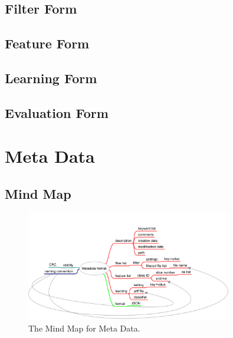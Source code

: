 \documentclass[a4paper,10pt]{article}
\begin{document}
	\subsection{Filter Form}
	\subsection{Feature Form}
	\subsection{Learning Form}
	\subsection{Evaluation Form}
	\section{Meta Data}\label{sec:mindmap}
	\subsection{Mind Map}
	
	\begin{figure}[!htp]
	    \centering
	    \includegraphics[width=0.8\textwidth]{Metadata}
	 
	    \caption{The Mind Map for Meta Data.}\label{fig:mind_model}
	\end{figure}
	
\end{document}
